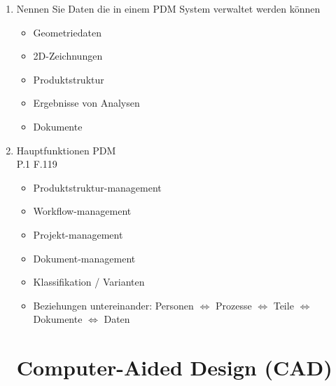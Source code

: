 \documentclass[10pt,a4paper,fleqn]{article}
\begin{document}
\begin{enumerate}
\begin{center}
		\end{center}
	\item Nennen Sie Daten die in einem PDM System verwaltet werden können
		\begin{itemize}
			\item Geometriedaten
			\item 2D-Zeichnungen
			\item Produktstruktur
			\item Ergebnisse von Analysen
			\item Dokumente
		\end{itemize}
	\item Hauptfunktionen PDM\\
		P.1 F.119
		\begin{itemize}
			\item Produktstruktur-management
			\item Workflow-management
			\item Projekt-management
			\item Dokument-management
			\item Klassifikation / Varianten
			\item Beziehungen untereinander: Personen $\Leftrightarrow$ Prozesse $\Leftrightarrow$ Teile $\Leftrightarrow$ Dokumente $\Leftrightarrow$ Daten
		\end{itemize}
\newpage
\section{Computer-Aided Design (CAD)}

\end{enumerate}
\end{document}
